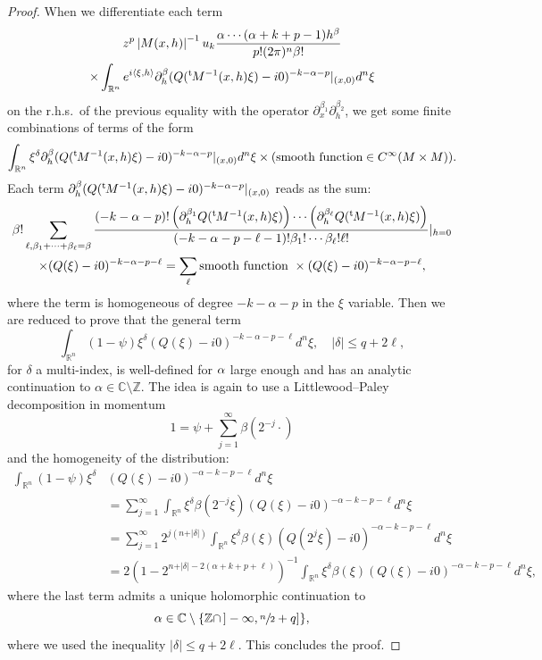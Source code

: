 \documentclass[JEP,XML,SOM,Unicode]{cedram}
\theoremstyle{definition}
\let\cv\alpha
\let\Re\relax
\DeclareMathOperator{\Re}{Re}
\newcommand{\module}[1]{\left|#1\right|}
\renewcommand{\t}{{{}^{\mathrm{t}\mkern-2mu}}}
\begin{document}
\begin{proof}
When we differentiate each term
\begin{multline*}
z^p \module{M(x,h)}^{-1} u_k \frac{\cv\cdots(\cv+k+p-1)h^\beta}{p!(2\pi)^n\beta!}\\
\times\int_{\mathbb{R}^n} e^{i\left\langle\xi,h \right\rangle}
\partial_h^\beta(Q(\t M^{-1}(x,h)\xi)-i0)^{-k-\cv-p}|_{(x,0)} d^n\xi
\end{multline*}
on the r.h.s.~of the previous equality with the operator $\partial_x^{\beta_1}\partial_h^{\beta_2}$,
we get some finite combinations of terms of the form
\[
\int_{\mathbb{R}^n} \xi^\delta
\partial_h^\beta(Q(\t M^{-1}(x,h)\xi)-i0)^{-k-\cv-p}|_{(x,0)} d^n\xi
\times (\text{smooth function}\in C^\infty(M\times M)).
\]
Each term $\partial_h^\beta(Q(\t M^{-1}(x,h)\xi)-i0)^{-k-\cv-p}|_{(x,0)} $ reads as the sum:
\begin{multline*}
\beta! \sum_{\ell,\beta_1+\cdots+\beta_\ell=\beta} \frac{(-k-\cv-p)! \left(\partial_h^{\beta_1}Q(\t M^{-1}(x,h)\xi)\right)\cdots
\left(\partial_h^{\beta_\ell}Q(\t M^{-1}(x,h)\xi)\right) }{(-k-\cv-p-\ell-1)!\beta_1!\cdots\beta_\ell!\ell!} |_{h=0}
\\
\times (Q(\xi)-i0)^{-k-\cv-p-\ell}=\sum_\ell \text{smooth function }\times (Q(\xi)-i0)^{-k-\cv-p-\ell},
\end{multline*}
where the term is homogeneous of degree $-k-\cv-p$ in the $\xi$ variable.
Then we are reduced to prove that
the general term
\[
\int_{\mathbb{R}^n}(1-\psi)\xi^\delta (Q(\xi)-i0)^{-k-\cv-p-\ell}d^n\xi , \quad \vert\delta\vert\leqslant q+2\ell,
\]
for $\delta$ a multi-index,
is well-defined for $\Re \cv$ large enough and
has an {analytic continuation} to $\cv\in \mathbb{C}\setminus \mathbb{Z}$. The idea is again to use a Littlewood--Paley decomposition in momentum
\[
1=\psi+\sum_{j=1}^\infty \beta(2^{-j}\cdot)
\]
and the homogeneity of the distribution:
\[
\begin{aligned}
\int_{\mathbb{R}^n}(1-\psi)\xi^\delta& (Q(\xi)-i0)^{-\cv-k-p-\ell} d^n\xi \\
&=\sum_{j=1}^\infty \int_{\mathbb{R}^n}\xi^\delta \beta(2^{-j}\xi) (Q(\xi)-i0)^{-\cv-k-p-\ell} d^n\xi\\
&=\sum_{j=1}^\infty 2^{j(n+\vert\delta\vert)}\int_{\mathbb{R}^n}\xi^\delta \beta(\xi) (Q(2^j\xi)-i0)^{-\cv-k-p-\ell} d^n\xi\\
&=2(1-2^{n+\vert\delta\vert-2(\cv+k+p+\ell)})^{-1}\int_{\mathbb{R}^n}\xi^\delta \beta(\xi) (Q(\xi)-i0)^{-\cv-k-p-\ell} d^n\xi,
\end{aligned}
\]
where the last term admits a unique holomorphic continuation to
\[
\cv\in \mathbb{C}\setminus \{\mathbb{Z}\cap \,]-\infty, \sfrac{n}{2} +q] \},
\]
where we used the inequality $\vert\delta\vert\leqslant q+2\ell$.
This concludes the proof.
\end{proof}

\backmatter


\end{document}

